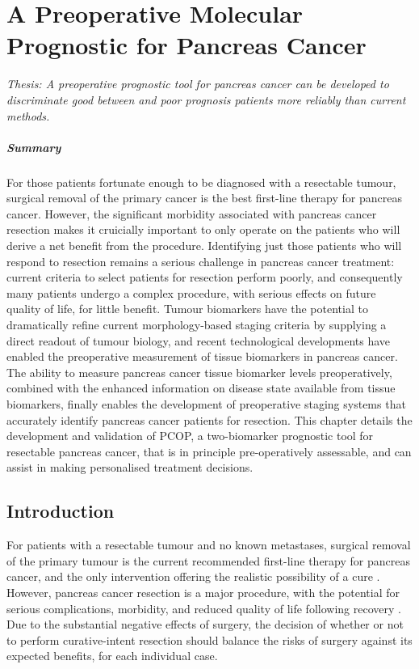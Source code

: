 \documentclass[dissertation.tex]{subfiles}
\begin{document}
\chapter{A Preoperative Molecular Prognostic for Pancreas Cancer}
\label{chap:nomogram}

\emph{Thesis: A preoperative prognostic tool for pancreas cancer can be developed to discriminate good between and poor prognosis patients more reliably than current methods.}

\paragraph{Summary}
For those patients fortunate enough to be diagnosed with a resectable tumour, surgical removal of the primary cancer is the best first-line therapy for pancreas cancer.  However, the significant morbidity associated with pancreas cancer resection makes it cruicially important to only operate on the patients who will derive a net benefit from the procedure.  Identifying just those patients who will respond to resection remains a serious challenge in pancreas cancer treatment: current criteria to select patients for resection perform poorly, and consequently many patients undergo a complex procedure, with serious effects on future quality of life, for little benefit.  Tumour biomarkers have the potential to dramatically refine current morphology-based staging criteria by supplying a direct readout of tumour biology, and recent technological developments have enabled the preoperative measurement of tissue biomarkers in pancreas cancer.  The ability to measure pancreas cancer tissue biomarker levels preoperatively, combined with the enhanced information on disease state available from tissue biomarkers, finally enables the development of preoperative staging systems that accurately identify pancreas cancer patients for resection.  This chapter details the development and validation of \gls{PCOP}, a two-biomarker prognostic tool for resectable pancreas cancer, that is in principle pre-operatively assessable, and can assist in making personalised treatment decisions.


\section{Introduction}
For patients with a resectable tumour and no known metastases, surgical removal of the primary tumour is the current recommended first-line therapy for pancreas cancer, and the only intervention offering the realistic possibility of a cure \cite{Editors2015}.  However, pancreas cancer resection is a major procedure, with the potential for serious complications, morbidity, and reduced quality of life following recovery \cite{Ho2005}.  Due to the substantial negative effects of surgery, the decision of whether or not to perform curative-intent resection should balance the risks of surgery against its expected benefits, for each individual case.
\end{document}
